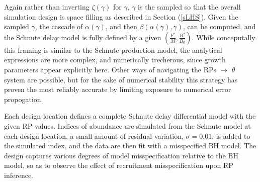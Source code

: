 %
Again rather than inverting $\zeta(\gamma)$ for $\gamma$, $\gamma$ is the 
sampled so that the overall simulation design is space filling as described in 
Section (\ref{sLHS}). Given the sampled $\gamma$, the cascade of $\alpha(\gamma)$, 
and then $\beta(\alpha(\gamma), \gamma)$, can be computed, and the Schnute 
delay model is fully defined by a given $(\frac{F^*}{M}, \frac{B^*}{B_0})$.
%
While conceputally this framing is similar to the Schnute production model, 
the analytical expressions are more complex, and numerically trecherous, since 
growth parameters appear explicitly here. Other ways of navigating the RPs $\mapsto$ $\theta$
system are possible, but for the sake of numerical stability this strategy has 
proven the most reliably accurate by limiting exposure to numerical error propogation. 

%
Each design location defines a complete Schnute delay differential model with 
the given RP values. Indices of abundance are simulated from the Schnute model 
at each design location, a small amount of residual variation, $\sigma = 0.01$, 
is added to the simulated index, and the data are then fit with a misspecified 
BH model. The design captures various degrees of model misspecification 
relative to the BH model, so as to observe the effect of recruitment 
misspecification upon RP inference.




